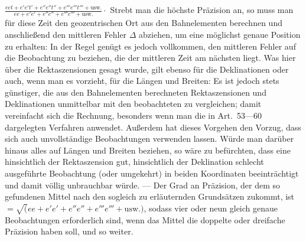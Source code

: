 $\frac{eet+e'e't'+e''e''t''+e'''e'''t'''+\text{usw.}}{ee+e'e'+e''e''+e'''e'''+\text{usw.}}\mathpunct{\cdot}$
Strebt man die höchste Präzision an, so muss man für diese Zeit den geozentrischen Ort aus den Bahnelementen berechnen und anschließend den mittleren Fehler $\Delta$ abziehen, um eine möglichst genaue Position zu erhalten: In der Regel genügt es jedoch vollkommen, den mittleren Fehler auf die Beobachtung zu beziehen, die der mittleren Zeit am nächsten liegt. Was hier über die Rektaszensionen gesagt wurde, gilt ebenso für die Deklinationen oder auch, wenn man es vorzieht, für die Längen und Breiten: Es ist jedoch stets günstiger, die aus den Bahnelementen berechneten Rektaszensionen und Deklinationen unmittelbar mit den beobachteten zu vergleichen; damit vereinfacht sich die Rechnung, besonders wenn man die in Art.\ 53---60 dargelegten Verfahren anwendet. Außerdem hat dieses Vorgehen den Vorzug, dass sich auch unvollständige Beobachtungen verwenden lassen. Würde man darüber hinaus alles auf Längen und Breiten beziehen, so wäre zu befürchten, dass eine hinsichtlich der Rektaszension gut, hinsichtlich der Deklination schlecht ausgeführte Beobachtung (oder umgekehrt) in beiden Koordinaten beeinträchtigt und damit völlig unbrauchbar würde. --- Der Grad an Präzision, der dem so gefundenen Mittel nach den sogleich zu erläuternden Grundsätzen zukommt, ist $=\surd(ee+e'e'+e''e''+e'''e'''+\text{usw.})$, sodass vier oder neun gleich genaue Beobachtungen erforderlich sind, wenn das Mittel die doppelte oder dreifache Präzision haben soll, und so weiter.
